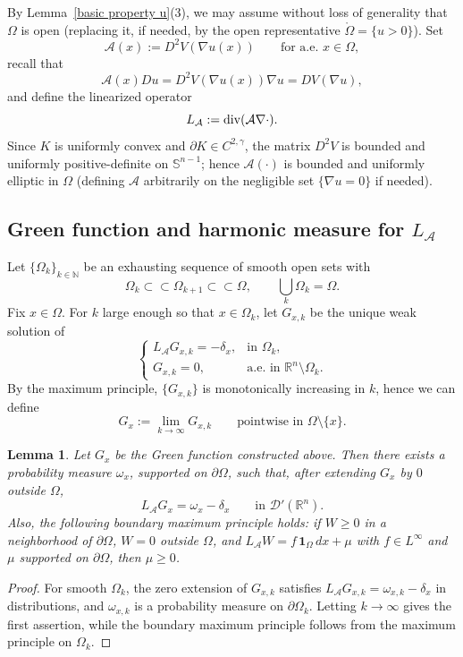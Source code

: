 \documentclass[reqno,11pt]{amsart}
\makeatletter
\newtheorem{lem}[thm]{Lemma}%
\numberwithin{equation}{section}
\theoremstyle{remark}
\makeatother
\begin{document}
By Lemma~\ref{basic property u}(3), we may assume without loss of generality that $\Omega$ is open (replacing it, if needed, by the
open representative $\mathring\Omega=\{u>0\}$).
Set
\[
\mathcal A(x):=D^2V(\nabla u(x)) \qquad \text{for a.e.\ }x\in\Omega,
\]
{recall that}
$$
{\mathcal A(x) Du= D^2V(\nabla u(x)) \nabla u = DV(\nabla u),}
$$
and define the linearized operator
\[
L_{\mathcal A}:={\rm div}(\mathcal A\nabla\cdot).
\]
Since $K$ is uniformly convex and $\partial K\in C^{2,\gamma}$, the matrix $D^2V$ is bounded and uniformly {positive-definite} on
$\mathbb S^{n-1}$; hence $\mathcal A(\cdot)$ is bounded and uniformly elliptic in $\Omega$ (defining $\mathcal A$ arbitrarily
on the negligible set $\{\nabla u=0\}$ if needed).

\subsection{Green function and harmonic measure for $L_{\mathcal A}$}

Let $\{\Omega_k\}_{k\in\mathbb N}$ be an exhausting sequence of smooth open sets with
\[
\Omega_k\subset\subset\Omega_{k+1}\subset\subset\Omega,
\qquad \bigcup_{k}\Omega_k=\Omega.
\]
Fix $x\in\Omega$. For $k$ large enough so that $x\in\Omega_k$, let $G_{x,k}$ be the unique weak solution of
\[
\left\{
\begin{array}{ll}
L_{\mathcal A} G_{x,k}=-\delta_x,& \text{in }\Omega_k,\\[2pt]
G_{x,k}=0,& \text{a.e.\ in }\mathbb R^n\setminus \Omega_k.
\end{array}
\right.
\]
By the maximum principle, $\{G_{x,k}\}$ is monotonically increasing in $k$, hence we can define
\[
G_x:=\lim_{k\to\infty}G_{x,k}\qquad\text{pointwise in }\Omega\setminus\{x\}.
\]

{
\begin{lem}\label{lem:elliptic-exhaustion}
Let $G_x$ be the Green function constructed above. Then there exists a probability measure $\omega_x$, supported on
$\partial\Omega$, such that, after extending $G_x$ by $0$ outside $\Omega$,
\[
L_{\mathcal A}G_x=\omega_x-\delta_x
\qquad\text{in }\mathscr D'(\mathbb R^n).
\]
Also, the following boundary maximum principle holds:
if $W \geq 0$ in a neighborhood of $\partial\Omega$, $W=0$ outside $\Omega$, and
$L_{\mathcal A}W=f\,\mathbf 1_\Omega\,dx+\mu$ with $f\in L^\infty$ and $\mu$ supported on $\partial\Omega$, then
$\mu\ge0$.
\end{lem}

\begin{proof}
For smooth $\Omega_k$, the zero extension of $G_{x,k}$ satisfies
$L_{\mathcal A}G_{x,k}=\omega_{x,k}-\delta_x$ in distributions, and $\omega_{x,k}$ is a probability measure on
$\partial\Omega_k$. Letting $k\to\infty$ gives the first assertion, while the boundary maximum principle follows
from the maximum principle on $\Omega_k$.
\end{proof}
}
\end{document}
